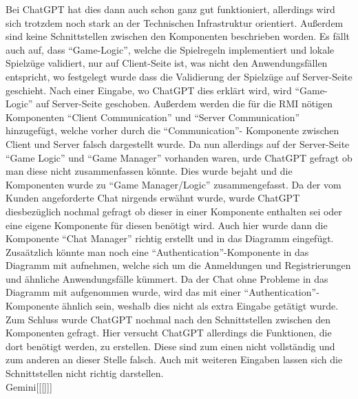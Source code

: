 Bei ChatGPT hat dies dann auch schon ganz gut funktioniert, allerdings wird sich trotzdem noch stark an der Technischen Infrastruktur orientiert.
Außerdem sind keine Schnittstellen zwischen den Komponenten beschrieben worden. Es fällt auch auf, dass ``Game-Logic'', welche die Spielregeln implementiert
und lokale Spielzüge validiert, nur auf Client-Seite ist, was nicht den Anwendungsfällen entspricht, wo festgelegt wurde dass die Validierung der 
Spielzüge auf Server-Seite geschieht. Nach einer Eingabe, wo ChatGPT dies erklärt wird, wird ``Game-Logic'' auf Server-Seite geschoben. Außerdem werden 
die für die RMI nötigen Komponenten ``Client Communication'' und ``Server Communication'' hinzugefügt, welche vorher durch die ``Communication''- Komponente 
zwischen Client und Server falsch dargestellt wurde. Da nun allerdings auf der Server-Seite ``Game Logic'' und ``Game Manager'' vorhanden waren, 
urde ChatGPT gefragt ob man diese nicht zusammenfassen könnte. Dies wurde bejaht und die Komponenten wurde zu ``Game Manager/Logic'' 
zusammengefasst. Da der vom Kunden angeforderte Chat nirgends erwähnt wurde, wurde ChatGPT diesbezüglich nochmal gefragt ob dieser in einer Komponente 
enthalten sei oder eine eigene Komponente für diesen benötigt wird. Auch hier wurde dann die Komponente ``Chat Manager'' richtig erstellt und in das Diagramm 
eingefügt. Zusaätzlich könnte man noch eine ``Authentication''-Komponente in das Diagramm mit aufnehmen, welche sich um die Anmeldungen und 
Registrierungen und ähnliche Anwendungsfälle kümmert. Da der Chat ohne Probleme in das Diagramm mit aufgenommen wurde, wird das mit einer 
``Authentication''-Komponente ähnlich sein, weshalb dies nicht als extra Eingabe getätigt wurde. Zum Schluss wurde ChatGPT nochmal nach den Schnittstellen 
zwischen den Komponenten gefragt. Hier versucht ChatGPT allerdings die Funktionen, die dort benötigt werden, zu erstellen. Diese sind zum einen nicht 
vollständig und zum anderen an dieser Stelle falsch. Auch mit weiteren Eingaben lassen sich die Schnittstellen nicht richtig darstellen.\\

Gemini[[[]]]\\

